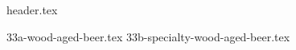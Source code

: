 \clearpage
{}
\divisorLine

{header.tex}

\begin{multicols}{2}

{33a-wood-aged-beer.tex}
{33b-specialty-wood-aged-beer.tex}

\end{multicols}